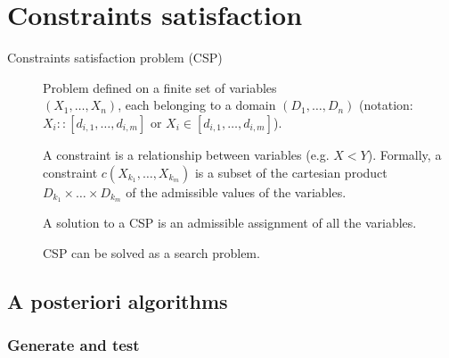\chapter{Constraints satisfaction}

\begin{description}
    \item[Constraints satisfaction problem (CSP)] 
        Problem defined on a finite set of variables\\$(X_1, \dots, X_n)$,
        each belonging to a domain $(D_1, \dots, D_n)$ 
        (notation: $X_i :: [d_{i,1}, \dots, d_{i,m}]$ or $X_i \in [d_{i,1}, \dots, d_{i,m}]$).

        A constraint is a relationship between variables (e.g. $X < Y$). 
        Formally, a constraint $c(X_{k_1}, \dots, X_{k_m})$ is a subset of the cartesian product
        $D_{k_1} \times \dots \times D_{k_m}$ of the admissible values of the variables.

        A solution to a CSP is an admissible assignment of all the variables.

        CSP can be solved as a search problem.
\end{description}



\section{A posteriori algorithms}

\subsection{Generate and test}

